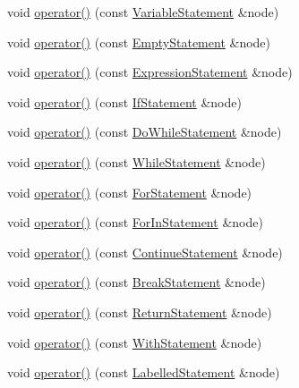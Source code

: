 \begin{DoxyCompactItemize}
\item 
void \hyperlink{struct_delegate_vistor_acedb866730fb2a6935ce83fcca70e0f1}{operator()} (const \hyperlink{struct_variable_statement}{Variable\+Statement} \&node)
\item 
void \hyperlink{struct_delegate_vistor_aadd695f67dd5929c3685994bec2296e2}{operator()} (const \hyperlink{struct_empty_statement}{Empty\+Statement} \&node)
\item 
void \hyperlink{struct_delegate_vistor_af45b11b7a3b3bb2e213c182cd98c517e}{operator()} (const \hyperlink{struct_expression_statement}{Expression\+Statement} \&node)
\item 
void \hyperlink{struct_delegate_vistor_ab863b34aedf8480973ed8615a148da5d}{operator()} (const \hyperlink{struct_if_statement}{If\+Statement} \&node)
\item 
void \hyperlink{struct_delegate_vistor_ac997e241943d6fc8d8984824eb4026ba}{operator()} (const \hyperlink{struct_do_while_statement}{Do\+While\+Statement} \&node)
\item 
void \hyperlink{struct_delegate_vistor_a19f6de63901518dd85896e84f33121b1}{operator()} (const \hyperlink{struct_while_statement}{While\+Statement} \&node)
\item 
void \hyperlink{struct_delegate_vistor_a8b4de7ebaa6256d46fa35458a905b573}{operator()} (const \hyperlink{struct_for_statement}{For\+Statement} \&node)
\item 
void \hyperlink{struct_delegate_vistor_a5e977f00098da416b2ba8cce9e6815da}{operator()} (const \hyperlink{struct_for_in_statement}{For\+In\+Statement} \&node)
\item 
void \hyperlink{struct_delegate_vistor_a7e9c7e2831d4d1fd618fd5c2a4eed85e}{operator()} (const \hyperlink{struct_continue_statement}{Continue\+Statement} \&node)
\item 
void \hyperlink{struct_delegate_vistor_a6c4e9c57c90d0f19cc72307670798cb6}{operator()} (const \hyperlink{struct_break_statement}{Break\+Statement} \&node)
\item 
void \hyperlink{struct_delegate_vistor_a6b49bd2929b053a5b5eae78017c2bef6}{operator()} (const \hyperlink{struct_return_statement}{Return\+Statement} \&node)
\item 
void \hyperlink{struct_delegate_vistor_acc7c7102de95484e447db60c571e7178}{operator()} (const \hyperlink{struct_with_statement}{With\+Statement} \&node)
\item 
void \hyperlink{struct_delegate_vistor_a949fb1eb908425e833f83f43717e41dc}{operator()} (const \hyperlink{struct_labelled_statement}{Labelled\+Statement} \&node)

\end{DoxyCompactItemize}
